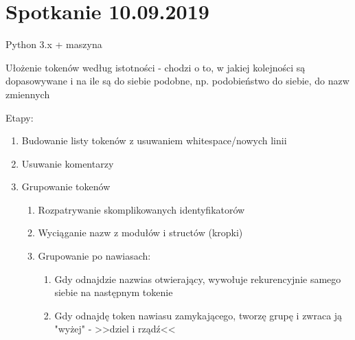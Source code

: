 \documentclass[11pt,oneside,a4paper,onecolumn]{article}
\begin{document}
\section{Spotkanie 10.09.2019}
Python 3.x + maszyna

Ułożenie tokenów według istotności - chodzi o to, w jakiej kolejności są dopasowywane i na ile są do siebie podobne, np. podobieństwo do siebie, do nazw zmiennych

Etapy:
\begin{enumerate}
\item Budowanie listy tokenów z usuwaniem whitespace/nowych linii
\item Usuwanie komentarzy
\item Grupowanie tokenów
\begin{enumerate}
 \item Rozpatrywanie skomplikowanych identyfikatorów
 \item Wyciąganie nazw z modułów i structów (kropki)
 \item Grupowanie po nawiasach: 
 \begin{enumerate}
 	\item Gdy odnajdzie nazwias otwierający, wywołuje rekurencyjnie samego siebie na następnym tokenie
 	\item Gdy odnajdę token nawiasu zamykającego, tworzę grupę i zwraca ją "wyżej" - >>dziel i rządź<<
 \end{enumerate}
\end{enumerate}

\end{enumerate}
\end{document}
